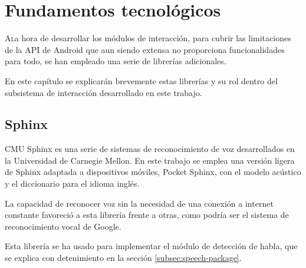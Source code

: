\chapter{Fundamentos tecnológicos}
\label{chap:fundamentos-tecnologicos}

\lettrine{A}  la hora de desarrollar los módulos de  interacción, para cubrir las limitaciones de la API de Android que aun siendo extensa no proporciona funcionalidades para todo, se han empleado una serie de librerías adicionales. 

En este capítulo se explicarán brevemente estas librerías y su rol dentro del subsistema de interacción desarrollado en este trabajo.
 \section{Sphinx}
 \label{subsec:sphinx}

 
 CMU Sphinx\cite{cmusphinx} es una serie de sistemas de reconocimiento de voz desarrollados en la Universidad de Carnegie Mellon.
 En este trabajo se emplea una versión ligera de Sphinx adaptada a dispositivos móviles, Pocket Sphinx, con el modelo acústico y el diccionario para el idioma inglés.
 
 La capacidad de reconocer voz sin la necesidad de una conexión a internet constante favoreció a esta librería frente a otras, como podría ser el sistema de reconocimiento vocal de Google.
 
 Esta librería se ha usado para implementar el módulo de detección de habla, que se explica con detenimiento en la sección \ref{subsec:speech-package}.



